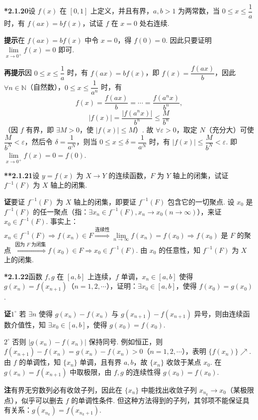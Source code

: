 \documentclass[UTF8, 12pt, fontset=fandol, oneside]{ctexart}
\begin{document}
\noindent\textbf{*2.1.20}\quad 设 $f(x)$ 在 $[0,1]$ 上定义，并且有界，$a,b>1$ 为两常数，当 $0\le x\le\dfrac1a$ 时，有 $f(ax)=bf(x)$，试证 $f$ 在 $x=0$ 处右连续.

\noindent\textbf{提示}\quad 在 $f(ax)=bf(x)$ 中令 $x=0$，得 $f(0)=0$. 因此只要证明 $\lim\limits_{x\to0^+}f(x)=0$ 即可.

\noindent\textbf{再提示}\quad 因 $0\le x\le\dfrac1a$ 时，有 $f(ax)=bf(x)$，即 $f(x)=\dfrac{f(ax)}b$，因此 $\forall n\in\mathbb{N}$（自然数），$0\le x\le\dfrac1{a^n}$ 时，有
\[
  f(x)=\frac{f(ax)}b=\cdots=\frac{f(a^n x)}{b^n},
\]
\[
  |f(x)|=\frac{|f(a^n x)|}{b^n}\le\frac{M}{b^n}
\]
（因 $f$ 有界，即 $\exists M>0$，使 $|f(x)|\le M$）. 故 $\forall\varepsilon>0$，取定 $N$（充分大）可使 $\dfrac{M}{b^N}<\varepsilon$，然后令 $\delta=\dfrac1{a^N}$，则当 $0\le x\le\delta=\dfrac1{a^N}$ 时，有 $|f(x)|\le\dfrac{M}{b^N}<\varepsilon$. 即 $\lim\limits_{x\to0^+}f(x)=0=f(0)$.

\noindent\textbf{**2.1.21}\quad 设 $y=f(x)$ 为 $X\to Y$ 的连续函数，$F$ 为 $Y$ 轴上的闭集，试证 $f^{-1}(F)$ 为 $X$ 轴上的闭集.

\noindent\textbf{证}\quad 要证 $f^{-1}(F)$ 为 $X$ 轴上的闭集，即要证 $f^{-1}(F)$ 包含它的一切聚点. 设 $x_0$ 是 $f^{-1}(F)$ 的任一聚点（指：$\exists x_n\in f^{-1}(F),x_n\to x_0(n\to\infty)$），来证 $x_0\in f^{-1}(F)$. 事实上：$x_n\in f^{-1}(F)\Rightarrow f(x_n)\in F \overset{\text{连续性}}{\Longrightarrow}\lim\limits_{n\to\infty}f(x_n)=f(x_0)\Rightarrow f(x_0)$ 是 $F$ 的聚点 $\overset{\text{因为 }F\text{ 为闭集}}{\Longrightarrow}f(x_0)\in F\Rightarrow x_0\in f^{-1}(F)$. 由 $x_0$ 的任意性，知 $f^{-1}(F)$ 为 $X$ 上的闭集.

\noindent\textbf{*2.1.22}\quad 函数 $f,g$ 在 $[a,b]$ 上连续，$f$ 单调，$x_n\in[a,b]$ 使得 $g(x_n)=f(x_{n+1})$（$n=1,2,\cdots$），证明：$\exists x_0\in[a,b]$，使得 $f(x_0)=g(x_0)$.

\noindent\textbf{证}\quad $1^\circ$ 若 $\exists n$ 使得 $g(x_n)-f(x_n)$ 与 $g(x_{n+1})-f(x_{n+1})$ 异号，则由连续函数介值性，知 $\exists x_0\in[a,b]$，使得 $g(x_0)=f(x_0)$.

$2^\circ$ 否则 $|g(x_n)-f(x_n)|$ 保持同号. 例如恒正，则 $f(x_{n+1})-f(x_n)=g(x_n)-f(x_n)>0$（$n=1,2,\cdots$），表明 $\{f(x_n)\}\nearrow$. 由 $f$ 的单调性，知 $\{x_n\}$ 单调，且有界 $a,b$，故 $\{x_n\}$ 收敛于某点 $x_0$. 在 $g(x_n)=f(x_{n+1})$ 中取极限，由 $f,g$ 的连续性得 $g(x_0)=f(x_0)$.

\noindent\textbf{注}\quad 有界无穷数列必有收敛子列，因此在 $\{x_n\}$ 中能找出收敛子列 $x_{n_k}\to x_0$（某极限点），似乎可以删去 $f$ 的单调性条件. 但这种方法得到的子列，其邻项不能保证具有关系：$g(x_{n_k})=f(x_{n_k+1})$.
\end{document}
